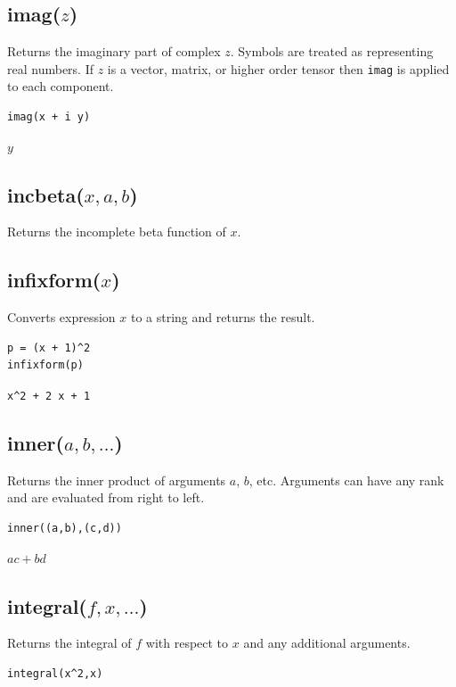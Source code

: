 \documentclass[12pt]{article}
\begin{document}
\subsection*{imag($z$)}

Returns the imaginary part of complex $z$.
Symbols are treated as representing real numbers.
If $z$ is a vector, matrix, or higher order tensor then
\verb$imag$ is applied to each component.

{\color{blue}
\begin{verbatim}
imag(x + i y)
\end{verbatim}
}

$y$

\subsection*{incbeta($x,a,b$)}

Returns the incomplete beta function of $x$.

\subsection*{infixform($x$)}

Converts expression $x$ to a string and returns the result.

{\color{blue}
\begin{verbatim}
p = (x + 1)^2
infixform(p)
\end{verbatim}
}

\verb$x^2 + 2 x + 1$

\subsection*{inner($a,b,\ldots$)}

Returns the inner product of arguments $a$, $b$, etc.
Arguments can have any rank and are evaluated from right to left.

{\color{blue}
\begin{verbatim}
inner((a,b),(c,d))
\end{verbatim}
}

$ac+bd$

\subsection*{integral($f,x,\ldots$)}

Returns the integral of $f$ with respect to $x$ and any additional arguments.

{\color{blue}
\begin{verbatim}
integral(x^2,x)
\end{verbatim}
}
\end{document}
